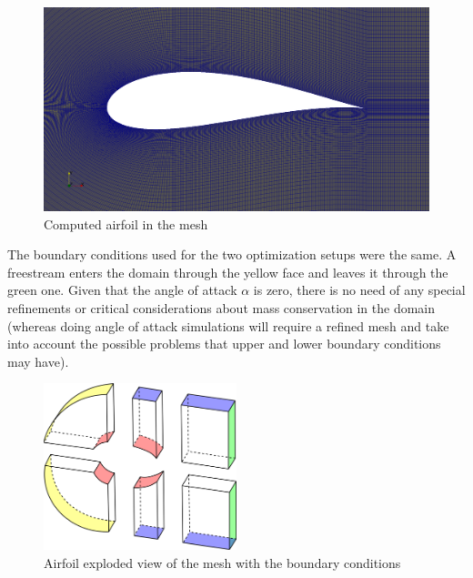      \begin{figure}[h!]
        \centering
        \includegraphics[width=\textwidth]{Figures/3/joukFoil.png}
        \caption{Computed airfoil in the mesh}
        \label{fig:computedJoukowsky}
    \end{figure}
        
    The boundary conditions used for the two optimization setups were the same. A freestream enters the domain through the yellow face and leaves it through the green one. Given that the angle of attack $\alpha$ is zero, there is no need of any special refinements or critical considerations about mass conservation in the domain (whereas doing angle of attack simulations will require a refined mesh and take into account the possible problems that upper and lower boundary conditions may have). 

    \vspace{3mm}    
    
     \begin{figure}[h!]
        \centering
        \small
        \includegraphics[width=0.5\textwidth]{Figures/3/airfoilBC.png}
        \caption{Airfoil exploded view of the mesh with the boundary conditions}
        \label{fig:airofilBCpic}
    \end{figure}
    
